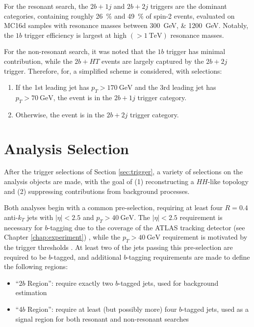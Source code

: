 For the resonant search, the $2b+1j$ and $2b+2j$ triggers are the dominant categories, containing roughly 26~\% and
49~\% of spin-2 events, evaluated on MC16d samples with resonance masses between \SIlist{300;1200}{\GeV}. Notably, 
the $1b$ trigger efficiency is largest at high $(>\SI{1}{\TeV})$ resonance masses.

For the non-resonant search, it was noted that the $1b$ trigger has minimal contribution, while the $2b+HT$ events are 
largely captured by the $2b+2j$ trigger. Therefore, for, a simplified scheme is considered, 
with selections:
\begin{enumerate}
	\item If the 1st leading jet has $p_{T} > \SI{170}{\GeV}$ and the 3rd leading jet has $p_{T} > \SI{70}{\GeV}$,
	the event is in the $2b+1j$ trigger category.
	\item Otherwise, the event is in the $2b+2j$ trigger category.
\end{enumerate}


\section{Analysis Selection}
After the trigger selections of Section \ref{sec:trigger}, a variety of selections on the analysis objects
are made, with the goal of (1) reconstructing a $HH$-like topology and (2) suppressing contributions from 
background processes. 

Both analyses begin with a common pre-selection, requiring at least four $R=0.4$ anti-$k_{T}$ jets with 
$|\eta| < 2.5$ and $p_{T} > \SI{40}{\GeV}$. The $|\eta| < 2.5$ requirement is necessary for $b$-tagging
due to the coverage of the ATLAS tracking detector (see Chapter \ref{chap:experiment}) , 
while the $p_{T} > \SI{40}{\GeV}$ requirement is motivated by the trigger thresholds .
At least two of the jets passing this pre-selection are required to be $b$-tagged, and additional $b$-tagging 
requirements are made to define the following regions:
\begin{itemize}
	\item ``2$b$ Region'': require exactly two $b$-tagged jets, used for background estimation
	\item ``4$b$ Region'': require at least (but possibly more) four $b$-tagged jets, used as a signal
	region for both resonant and non-resonant searches
\end{itemize}

